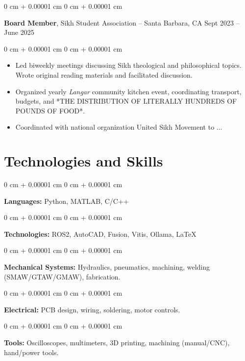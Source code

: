 \documentclass[10pt, letterpaper]{article}
\newenvironment{highlights}{
    \begin{itemize}[
        topsep=0.10 cm,
        parsep=0.10 cm,
        partopsep=0pt,
        itemsep=0pt,
        leftmargin=0 cm + 10pt
    ]
}{
    \end{itemize}
} %
\newenvironment{onecolentry}{
    \begin{adjustwidth}{
        0 cm + 0.00001 cm
    }{
        0 cm + 0.00001 cm
    }
}{
    \end{adjustwidth}
} %
\newenvironment{twocolentry}[2][]{
    \onecolentry
    \def\secondColumn{#2}
    \setcolumnwidth{\fill, 4.5 cm}
    \begin{paracol}{2}
}{
    \switchcolumn \raggedleft \secondColumn
    \end{paracol}
    \endonecolentry
} %
\begin{document}
        \begin{twocolentry}{
            Sept 2023 – June 2025
        }
            \textbf{Board Member}, Sikh Student Association -- Santa Barbara, CA \end{twocolentry}

        \vspace{0.10 cm}
        \begin{onecolentry}
            \begin{highlights}
                \item Led biweekly meetings discussing Sikh theological and philosophical topics. Wrote original reading materials and facilitated discussion.
                \item Organized yearly \textit{Langar} community kitchen event, coordinating transport, budgets, and *THE DISTRIBUTION OF LITERALLY HUNDREDS OF POUNDS OF FOOD*.
                \item Coordinated with national organization United Sikh Movement to ...
            \end{highlights}
        \end{onecolentry}

    \section{Technologies and Skills}

        \begin{onecolentry}
            \textbf{Languages:} Python, MATLAB, C/C++
        \end{onecolentry}

        \vspace{0.1 cm}

        \begin{onecolentry}
            \textbf{Technologies:} ROS2, AutoCAD, Fusion, Vitis, Ollama, \LaTeX
        \end{onecolentry}
        
        \vspace{0.1 cm}

        \begin{onecolentry}
            \textbf{Mechanical Systems:} Hydraulics, pneumatics, machining, welding (SMAW/GTAW/GMAW), fabrication. 
        \end{onecolentry}

        \vspace{0.1 cm}

        \begin{onecolentry}
            \textbf{Electrical:} PCB design, wiring, soldering, motor controls.
        \end{onecolentry}

        \vspace{0.1 cm}

        \begin{onecolentry}
            \textbf{Tools:} Oscilloscopes, multimeters, 3D printing, machining (manual/CNC), hand/power tools.
        \end{onecolentry}
\end{document}
